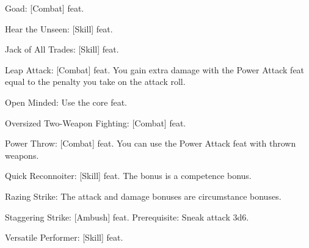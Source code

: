 \begin{itemize*}
\item Goad: [Combat] feat.
\item Hear the Unseen: [Skill] feat.
\item Jack of All Trades: [Skill] feat.
\item Leap Attack: [Combat] feat. You gain extra damage with the Power Attack feat equal to the penalty you take on the attack roll.
\item Open Minded: Use the core feat.
\item Oversized Two-Weapon Fighting: [Combat] feat.
\item Power Throw: [Combat] feat. You can use the Power Attack feat with thrown weapons.
\item Quick Reconnoiter: [Skill] feat. The bonus is a competence bonus.
\item Razing Strike: The attack and damage bonuses are circumstance bonuses.
\item Staggering Strike: [Ambush] feat. Prerequisite: Sneak attack \plus3d6.
\item Versatile Performer: [Skill] feat.
\end{itemize*}
